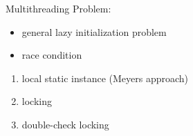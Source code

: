 \documentclass{beamer}
\begin{document}
\begin{frame}{Multithreading}
Problem:
\begin{itemize}
  \item general lazy initialization problem
  \item race condition
\end{itemize}

\begin{enumerate}[A]
    \item<2-> local static instance (Meyers approach)
    \item<3-> locking
    \item<5-> double-check locking
\end{enumerate}

\end{frame}
\end{document}
